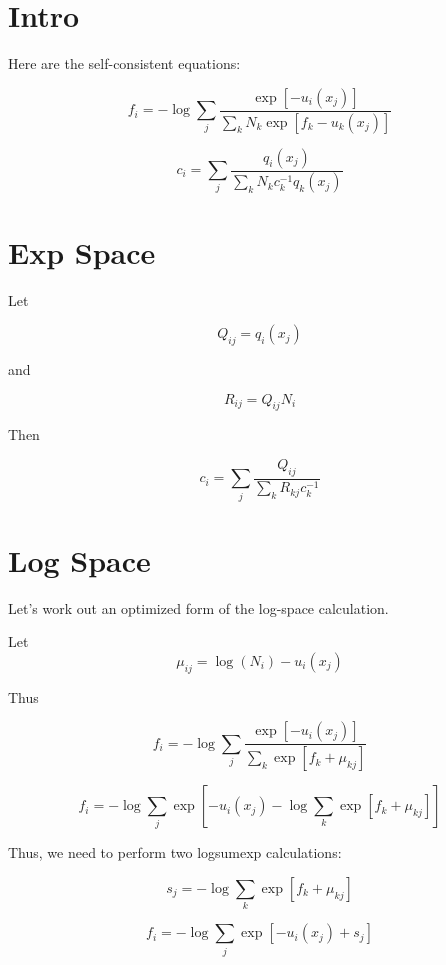\documentclass[12pt]{article}
\begin{document}
\section{Intro}

Here are the self-consistent equations:

$$f_i = -\log \sum_j \frac{\exp[-u_i(x_j)]}{\sum_k N_k \exp[f_k - u_k(x_j)]}$$

$$c_i = \sum_j \frac{q_i(x_j)}{\sum_k N_k c_k^{-1} q_k(x_j)}$$

\section{Exp Space}

Let

$$Q_{ij} = q_i(x_j)$$

and 

$$R_{ij} = Q_{ij} N_i$$

Then 

$$c_i = \sum_j \frac{Q_{ij}}{\sum_k R_{kj} c_k^{-1}}$$


\section{Log Space}

Let's work out an optimized form of the log-space calculation.  

Let 
$$\mu_{ij} = \log(N_i) -u_i(x_j)$$

Thus

$$f_i = -\log \sum_j \frac{\exp[-u_i(x_j)]}{\sum_k \exp[f_k + \mu_{kj}]}$$

$$f_i = -\log \sum_j \exp[-u_i(x_j) - \log \sum_k \exp[f_k + \mu_{kj}]]$$

Thus, we need to perform two logsumexp calculations:

$$s_j = -\log \sum_k \exp[f_k + \mu_{kj}]$$

$$f_i = -\log \sum_j \exp[-u_i(x_j) + s_j]$$
\end{document}
